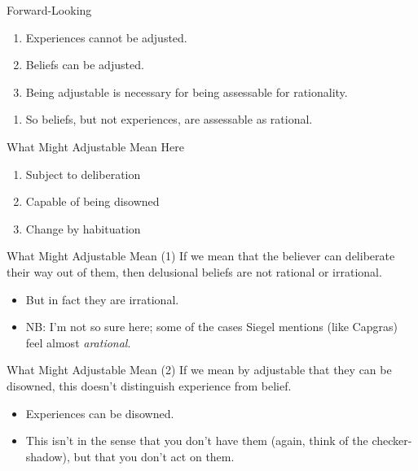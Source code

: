 \documentclass[
  17pt,
  letterpaper,
  ignorenonframetext,
  aspectratio=169,
  handout,
  xcolor={dvipsnames}]{beamer}
\providecommand{\tightlist}{%
  \setlength{\itemsep}{0pt}\setlength{\parskip}{0pt}}\usepackage{longtable,booktabs,array}
\begin{document}
\begin{frame}{Forward-Looking}
\protect\hypertarget{forward-looking}{}
\begin{enumerate}[<+->]
\tightlist
\item
  Experiences cannot be adjusted.
\item
  Beliefs can be adjusted.
\item
  Being adjustable is necessary for being assessable for rationality.
\end{enumerate}

\begin{enumerate}[<+->]
[A.]
\setcounter{enumi}{2}
\tightlist
\item
  So beliefs, but not experiences, are assessable as rational.
\end{enumerate}
\end{frame}

\begin{frame}{What Might Adjustable Mean Here}
\protect\hypertarget{what-might-adjustable-mean-here}{}
\begin{enumerate}[<+->]
\tightlist
\item
  Subject to deliberation
\item
  Capable of being disowned
\item
  Change by habituation
\end{enumerate}
\end{frame}

\begin{frame}{What Might Adjustable Mean (1)}
\protect\hypertarget{what-might-adjustable-mean-1}{}
If we mean that the believer can deliberate their way out of them, then
delusional beliefs are not rational or irrational.

\begin{itemize}[<+->]
\tightlist
\item
  But in fact they are irrational.
\item
  NB: I'm not so sure here; some of the cases Siegel mentions (like
  Capgras) feel almost \emph{arational}.
\end{itemize}
\end{frame}

\begin{frame}{What Might Adjustable Mean (2)}
\protect\hypertarget{what-might-adjustable-mean-2}{}
If we mean by adjustable that they can be disowned, this doesn't
distinguish experience from belief.

\begin{itemize}[<+->]
\tightlist
\item
  Experiences can be disowned.
\item
  This isn't in the sense that you don't have them (again, think of the
  checker-shadow), but that you don't act on them.
\end{itemize}
\end{frame}
\end{document}

